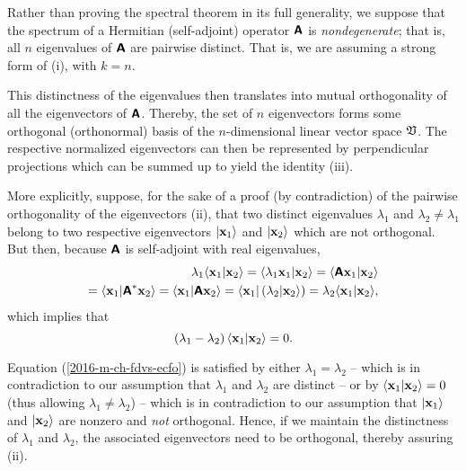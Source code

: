 {\color{OliveGreen}
\bproof
Rather than proving the spectral theorem in its full generality,
we suppose that the spectrum of a Hermitian (self-adjoint) operator $ \textsf{\textbf{A}}$ is {\em nondegenerate};
that is, all $n$ eigenvalues of $\textsf{\textbf{A}}$ are pairwise distinct.
That is, we are assuming a strong form of (i), with $k=n$.

This distinctness of the eigenvalues then translates into mutual orthogonality of all the eigenvectors of $ \textsf{\textbf{A}}$.
Thereby, the set of $n$ eigenvectors forms some orthogonal (orthonormal) basis of the $n$-dimensional linear vector space $\frak V$.
The respective normalized eigenvectors can then be represented by perpendicular projections which can be summed up to yield the identity
(iii).

More explicitly, suppose, for the sake of a proof (by contradiction) of the pairwise orthogonality of the eigenvectors (ii),
that two distinct eigenvalues
$\lambda_1$
and
$\lambda_2 \neq \lambda_1$
belong to two respective eigenvectors
$\vert {\bf x}_1\rangle $
and
$\vert {\bf x}_2\rangle $
which are not orthogonal.
But then, because $\textsf{\textbf{A}}$ is self-adjoint with real eigenvalues,
\begin{equation}
\begin{split}
\lambda_1  \langle {\bf x}_1 \vert {\bf x}_2 \rangle =
\langle \lambda_1  {\bf x}_1 \vert {\bf x}_2 \rangle =
  \langle \textsf{\textbf{A}}{\bf x}_1 \vert {\bf x}_2 \rangle \\=
  \langle {\bf x}_1 \vert \textsf{\textbf{A}}^\ast  {\bf x}_2 \rangle =
  \langle {\bf x}_1 \vert \textsf{\textbf{A}}{\bf x}_2 \rangle =
  \langle {\bf x}_1\vert \left( \lambda_2 \vert {\bf x}_2 \rangle \right)=
  \lambda_2 \langle {\bf x}_1 \vert {\bf x}_2 \rangle,
\end{split}
\end{equation}
which implies that
\begin{equation}
\left(\lambda_1 - \lambda_2\right)
\langle {\bf x}_1 \vert {\bf x}_2 \rangle
=
0
.
\label{2016-m-ch-fdvs-ecfo}
\end{equation}

Equation (\ref{2016-m-ch-fdvs-ecfo}) is satisfied by
either $\lambda_1  = \lambda_2$
--
which is in contradiction to our assumption that $\lambda_1$ and $\lambda_2$ are distinct
--
or by  $\langle {\bf x}_1 \vert {\bf x}_2 \rangle =0$  (thus allowing $\lambda_1  \neq \lambda_2$) --
which is in contradiction to our assumption that $\vert {\bf x}_1\rangle$ and $\vert  {\bf x}_2\rangle$
are nonzero and {\em not} orthogonal.
Hence, if we maintain the distinctness of $\lambda_1$ and $\lambda_2$, the associated eigenvectors need to be orthogonal,
thereby assuring (ii).

}
